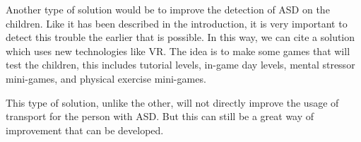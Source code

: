 Another type of solution would be to improve the detection of ASD on the children. Like it has been described in the introduction, it is very important to detect this trouble the earlier that is possible. In this way, we can cite a solution which uses new technologies like VR. The idea is to make some games that will test the children, this includes tutorial levels, in-game day levels, mental stressor mini-games, and physical exercise mini-games\cite{2021DesigningSmartVirtual}.

This type of solution, unlike the other, will not directly improve the usage of transport for the person with ASD. But this can still be a great way of improvement that can be developed. 
